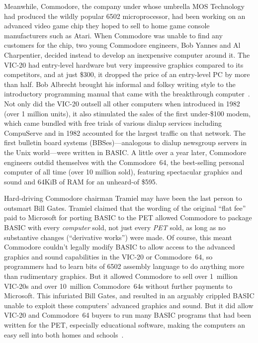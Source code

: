 
Meanwhile, Commodore, the company under whose umbrella MOS Technology
had produced the wildly popular 6502 microprocessor, had been working on
an advanced video game chip they hoped to sell to home game console manufacturers
such as Atari.
When Commodore was unable to find any customers for the chip, two young
Commodore engineers, Bob Yannes and Al Charpentier, decided instead to
develop an inexpensive computer around it.
The VIC-20 had entry-level hardware but very impressive graphics
compared to its competitors, and at just \$300, it dropped the price
of an entry-level PC by more than half.
Bob Albrecht brought his informal and folksy writing style to the
introductory programming manual that came with the breakthrough
computer~\cite{commodore}.
Not only did the VIC-20 outsell all other computers when introduced in
1982 (over 1 million units), it also stimulated the sales of the first
under-\$100 modem, which came bundled with free trials of various dialup
services including CompuServe and in 1982 accounted for the largest
traffic on that network.
The first bulletin board systems (BBSes)---analogous to dialup
newsgroup servers in the Unix world---were written in BASIC.
A little over a year later, Commodore engineers outdid themselves with
the Commodore~64, the best-selling personal computer of all time (over
10 million sold), featuring spectacular graphics and sound and 64KiB
of RAM for an unheard-of \$595.

\begin{tangent}
Hard-driving Commodore chairman Tramiel may have been the last person to
outsmart Bill Gates.
Tramiel claimed that the wording of the original ``flat fee'' paid to
Microsoft for porting BASIC to the PET allowed Commodore to package
BASIC with every \emph{computer} sold, not just every \emph{PET} sold,
as long as no substantive changes (``derivative works'') were made.
Of course, this meant Commodore couldn't legally modify BASIC to allow
access to the advanced graphics and sound capabilities in the VIC-20 or
Commodore~64, so programmers had to learn bits of 6502 assembly language
to do anything more than rudimentary graphics.
But it allowed Commodore to sell over 1~million VIC-20s and over
10~million Commodore~64s without further payments to Microsoft.
This infuriated Bill Gates, and resulted in an arguably crippled BASIC
unable to exploit these computers' advanced graphics and sound.
But it did allow VIC-20 and Commodore~64 buyers to run many BASIC
programs that had been written for the PET, especially educational
software, making the computers an easy sell into both homes and
schools~\cite[p. 414]{commodore}.
\end{tangent}


